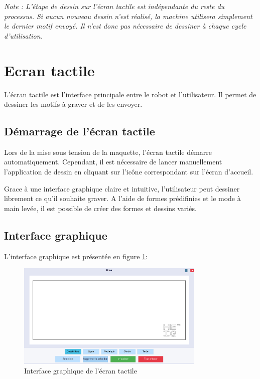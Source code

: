 \textit{Note : L'étape de dessin sur l'écran tactile est indépendante du reste du processus. Si aucun nouveau dessin n'est réalisé, la machine utilisera simplement le dernier motif envoyé. Il n'est donc pas nécessaire de dessiner à chaque cycle d'utilisation.}

\section{Ecran tactile}

L'écran tactile est l'interface principale entre le robot et l'utilisateur. Il permet de dessiner les motifs à graver et de les envoyer.

\subsection{Démarrage de l'écran tactile}

Lors de la mise sous tension de la maquette, l'écran tactile démarre automatiquement. Cependant, il est nécessaire de lancer manuellement l'application de dessin en cliquant sur l'icône correspondant sur l'écran d'accueil.

Grace à une interface graphique claire et intuitive, l'utilisateur peut dessiner librement ce qu'il souhaite graver. A l'aide de formes prédifinies et le mode à main levée, il est possible de créer des formes et dessins variés.

\subsection{Interface graphique}

L'interface graphique est présentée en figure \ref{fig:interface_graphique}:
\begin{figure}[H]
    \centering
    \includegraphics[width=0.8\textwidth]{assets/figures/Draw_app.png}
    \caption{Interface graphique de l'écran tactile}
    \label{fig:interface_graphique}
\end{figure}

